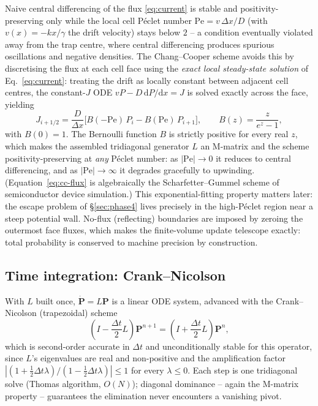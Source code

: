 \documentclass[11pt]{article}
\newcommand{\dd}{\mathrm{d}}
\begin{document}
Naive central differencing of the flux \eqref{eq:current} is stable and positivity-preserving only while the local cell P\'eclet number $\mathrm{Pe} = v\,\Delta x/D$ (with $v(x) = -kx/\gamma$ the drift velocity) stays below $2$ -- a condition eventually violated away from the trap centre, where central differencing produces spurious oscillations and negative densities. The Chang--Cooper scheme \cite{ChangCooper1970} avoids this by discretising the flux at each cell face using the \emph{exact local steady-state solution} of Eq.~\eqref{eq:current}: treating the drift as locally constant between adjacent cell centres, the constant-$J$ ODE $vP - D\,\dd P/\dd x = J$ is solved exactly across the face, yielding
\begin{equation}
J_{i+1/2} = \frac{D}{\Delta x}\Big[B(-\mathrm{Pe})\,P_i - B(\mathrm{Pe})\,P_{i+1}\Big], \qquad
B(z) = \frac{z}{e^z - 1},
\label{eq:cc-flux}
\end{equation}
with $B(0)=1$. The Bernoulli function $B$ is strictly positive for every real $z$, which makes the assembled tridiagonal generator $L$ an M-matrix and the scheme positivity-preserving at \emph{any} P\'eclet number: as $|\mathrm{Pe}|\to 0$ it reduces to central differencing, and as $|\mathrm{Pe}|\to\infty$ it degrades gracefully to upwinding. (Equation~\eqref{eq:cc-flux} is algebraically the Scharfetter--Gummel scheme of semiconductor device simulation.) This exponential-fitting property matters later: the escape problem of \S\ref{sec:phase4} lives precisely in the high-P\'eclet region near a steep potential wall. No-flux (reflecting) boundaries are imposed by zeroing the outermost face fluxes, which makes the finite-volume update telescope exactly: total probability is conserved to machine precision by construction.

\subsection{Time integration: Crank--Nicolson}

With $L$ built once, $\dot{\mathbf{P}}=L\mathbf{P}$ is a linear ODE system, advanced with the Crank--Nicolson (trapezoidal) scheme
\begin{equation}
\left(I - \frac{\Delta t}{2}L\right)\mathbf{P}^{n+1} = \left(I + \frac{\Delta t}{2}L\right)\mathbf{P}^n,
\label{eq:cn}
\end{equation}
which is second-order accurate in $\Delta t$ and unconditionally stable for this operator, since $L$'s eigenvalues are real and non-positive and the amplification factor $|(1+\tfrac12\Delta t\lambda)/(1-\tfrac12\Delta t\lambda)| \le 1$ for every $\lambda \le 0$. Each step is one tridiagonal solve (Thomas algorithm, $O(N)$); diagonal dominance -- again the M-matrix property -- guarantees the elimination never encounters a vanishing pivot.
\end{document}
